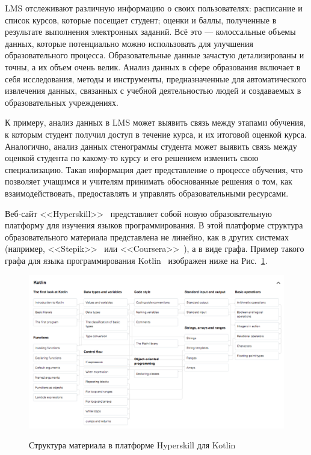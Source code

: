 \documentclass[14pt]{matmex-diploma-custom}
\begin{document}
LMS отслеживают различную информацию о своих пользователях: расписание и список курсов, которые посещает студент; оценки и баллы, полученные в результате выполнения электронных заданий. Всё это --- колоссальные объемы данных, которые потенциально можно использовать для улучшения образовательного процесса. Образовательные данные зачастую детализированы и точны, а их объем очень велик. Анализ данных в сфере образования включает в себя исследования, методы и инструменты, предназначенные для автоматического извлечения данных, связанных с учебной деятельностью людей и создаваемых в образовательных учреждениях.

К примеру, анализ данных в LMS может выявить связь между этапами обучения, к которым студент получил доступ в течение курса, и их итоговой оценкой курса. Аналогично, анализ данных стенограммы студента может выявить связь между оценкой студента по какому-то курсу и его решением изменить свою специализацию. Такая информация дает представление о процессе обучения, что позволяет учащимся и учителям принимать обоснованные решения о том, как взаимодействовать, предоставлять и управлять образовательными ресурсами.

Веб-сайт <<Hyperskill>>~\cite{hyperskill} представляет собой новую образовательную платформу для изучения языков программирования. В этой платформе структура образовательного материала представлена не линейно, как в других системах (например, <<Stepik>>~\cite{stepik} или <<Coursera>>~\cite{coursera}), а в виде графа. Пример такого графа для языка программирования Kotlin~\cite{kotlin} изображен ниже на Рис.~\ref{kotlinmap}. 

\begin{figure}[!htb]
\caption{Структура материала в платформе Hyperskill для Kotlin}
\hspace*{-1cm}
\includegraphics[scale=0.5]{kotlinmap}
\label{kotlinmap}
\end{figure}
\end{document}
